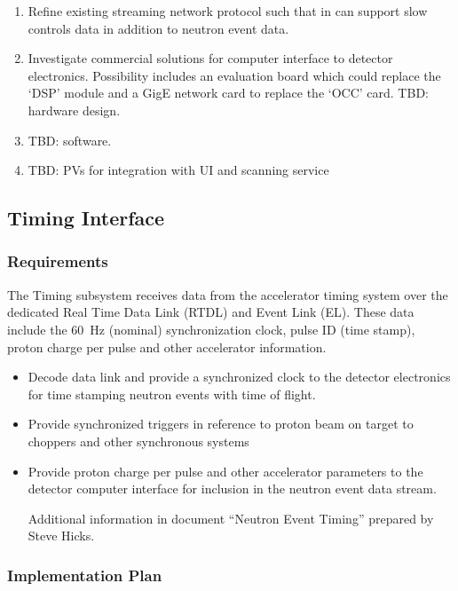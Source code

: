 \begin{enumerate}

\item Refine existing streaming network protocol such that in can support
slow controls data in addition to neutron event data.

\item Investigate commercial solutions for computer interface to detector
electronics. Possibility includes an evaluation board which could replace
the `DSP' module and a GigE network card to replace the `OCC' card.
TBD: hardware design.

\item TBD: software.

\item TBD: PVs for integration with UI and scanning service

\end{enumerate}

\subsection{Timing Interface}
\subsubsection{Requirements}

The Timing subsystem receives data from the accelerator timing system
over the dedicated Real Time Data Link (RTDL) and Event Link (EL). These
data include the 60~Hz (nominal) synchronization clock, pulse ID (time
stamp), proton charge per pulse and other accelerator information.


\begin{itemize}
\item Decode data link and provide a synchronized clock to the detector
electronics for time stamping neutron events with time of flight.  \item
Provide synchronized triggers in reference to proton beam on target to
choppers and other synchronous systems \item Provide proton charge per
pulse and other accelerator parameters to the detector computer interface
for inclusion in the neutron event data stream.

Additional information in document ``Neutron Event Timing'' prepared by
Steve Hicks.

\end{itemize}

\subsubsection{Implementation Plan}

